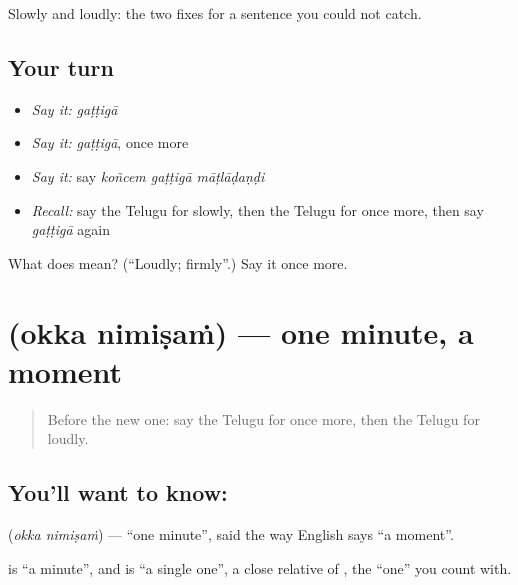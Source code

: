 \begin{grammarlens}[title={What you've built}]
Slowly and loudly: the two fixes for a sentence you could not catch.
\end{grammarlens}

\subsection*{Your turn}
\begin{itemize}
\raggedright
  \item \emph{Say it:} \emph{gaṭṭigā}
  \item \emph{Say it:} \emph{gaṭṭigā}, once more
  \item \emph{Say it:} say \emph{koñcem gaṭṭigā māṭlāḍaṇḍi}
  \item \emph{Recall:} say the Telugu for slowly, then the Telugu for once more, then say \emph{gaṭṭigā} again
\end{itemize}

\begin{tcolorbox}[breakable,colback=teal!4,colframe=teal!35!black,title={Before you move on}]
What does  mean? (\textquotedblleft{}Loudly; firmly\textquotedblright{}.) Say it once more.
\end{tcolorbox}
\section[\texorpdfstring{\te{ఒక్క} \te{నిమిషం} (okka nimiṣaṁ)}{ఒక్క నిమిషం (okka nimiṣaṁ)}]{  (okka nimiṣaṁ) — one minute, a moment}

\label{lesson:TE-C86-oneminute}



\begin{quote}
Before the new one: say the Telugu for once more, then the Telugu for loudly.
\end{quote}

\subsection*{You'll want to know:  }
\textbf{ } (\emph{okka nimiṣaṁ}) — \textquotedblleft{}one minute\textquotedblright{}, said the way English says \textquotedblleft{}a moment\textquotedblright{}.

\textbf{} is \textquotedblleft{}a minute\textquotedblright{}, and \textbf{} is \textquotedblleft{}a single one\textquotedblright{}, a close relative of \textbf{}, the \textquotedblleft{}one\textquotedblright{} you count with.

